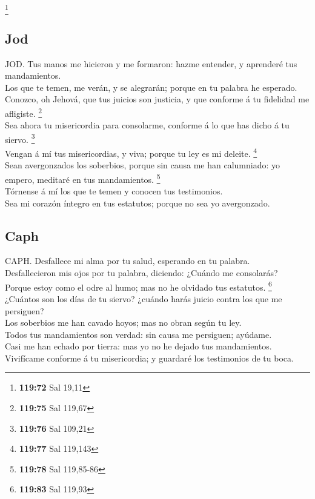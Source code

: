 \footnote{\textbf{119:72} Sal 19,11}

\hypertarget{jod}{%
\subsection{Jod}\label{jod}}

 JOD. Tus manos me hicieron y me formaron: hazme
entender, y aprenderé tus mandamientos.\\
 Los que te temen, me verán, y se alegrarán; porque en tu
palabra he esperado.\\
 Conozco, oh Jehová, que tus juicios son justicia, y que
conforme á tu fidelidad me afligiste. \footnote{\textbf{119:75} Sal
  119,67}\\
 Sea ahora tu misericordia para consolarme, conforme á lo
que has dicho á tu siervo. \footnote{\textbf{119:76} Sal 109,21}\\
 Vengan á mí tus misericordias, y viva; porque tu ley es
mi deleite. \footnote{\textbf{119:77} Sal 119,143}\\
 Sean avergonzados los soberbios, porque sin causa me han
calumniado: yo empero, meditaré en tus mandamientos. \footnote{\textbf{119:78}
  Sal 119,85-86}\\
 Tórnense á mí los que te temen y conocen tus
testimonios.\\
 Sea mi corazón íntegro en tus estatutos; porque no sea
yo avergonzado.

\hypertarget{caph}{%
\subsection{Caph}\label{caph}}

 CAPH. Desfallece mi alma por tu salud, esperando en tu
palabra.\\
 Desfallecieron mis ojos por tu palabra, diciendo:
¿Cuándo me consolarás?\\
 Porque estoy como el odre al humo; mas no he olvidado
tus estatutos. \footnote{\textbf{119:83} Sal 119,93}\\
 ¿Cuántos son los días de tu siervo? ¿cuándo harás juicio
contra los que me persiguen?\\
 Los soberbios me han cavado hoyos; mas no obran según tu
ley.\\
 Todos tus mandamientos son verdad: sin causa me
persiguen; ayúdame.\\
 Casi me han echado por tierra: mas yo no he dejado tus
mandamientos.\\
 Vivifícame conforme á tu misericordia; y guardaré los
testimonios de tu boca.

